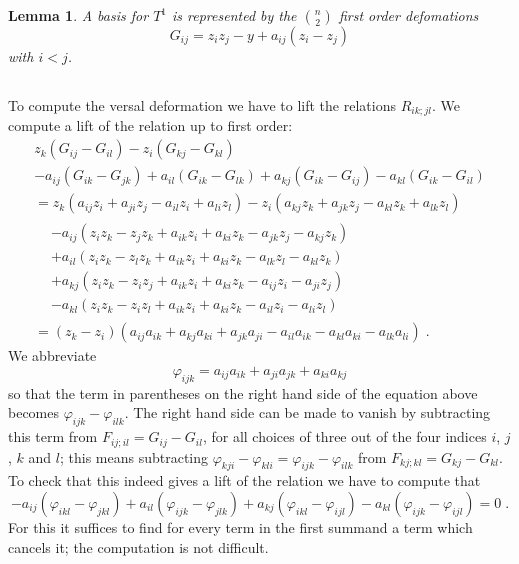 \documentclass[12pt,a4paper]{amsart}  %
\newcommand{\vp}{\varphi}
\newtheorem{lemma}[thm]{Lemma}
\theoremstyle{definition}
\theoremstyle{remark}
\newtheorem{remark}[thm]{Remark}
\begin{document}
\begin{lemma}
A basis for $T^1$ is represented by the $\binom n2$ first order defomations
\[G_{ij}=z_iz_j-y+ a_{ij}(z_i-z_j)\]
with $i<j$.
\end{lemma}




\subsection{}%
To compute the versal deformation we have to lift the relations $R_{ik;jl}$.
We %
compute a lift of the
relation up to first order:
\begin{multline*}
z_k(G_{ij}-G_{il})-z_i(G_{kj}-G_{kl})\\-a_{ij}(G_{ik}-G_{jk})+a_{il}(G_{ik}-G_{lk})
+a_{kj}(G_{ik}-G_{ij})-a_{kl}(G_{ik}-G_{il})
\\{}=
z_k(a_{ij}z_i+a_{ji}z_j -a_{il}z_i+a_{li}z_l)-z_i(a_{kj}z_k+a_{jk}z_j -a_{kl}z_k+a_{lk}z_l)\\
\begin{aligned}
&-a_{ij}(z_iz_k-z_jz_k+a_{ik}z_i+a_{ki}z_k-a_{jk}z_j-a_{kj}z_k)\\
&+a_{il}(z_iz_k-z_lz_k+a_{ik}z_i+a_{ki}z_k-a_{lk}z_l-a_{kl}z_k)\\
&+a_{kj}(z_iz_k-z_iz_j+a_{ik}z_i+a_{ki}z_k-a_{ij}z_i-a_{ji}z_j)\\
&-a_{kl}(z_iz_k-z_iz_l+a_{ik}z_i+a_{ki}z_k-a_{il}z_i-a_{li}z_l)
\end{aligned}\\{}
=(z_k-z_i)(a_{ij}a_{ik}+a_{kj}a_{ki}+a_{jk}a_{ji}-a_{il}a_{ik}-a_{kl}a_{ki}-a_{lk}a_{li})\;.
\end{multline*}
We abbreviate 
\[
\vp_{ijk} = a_{ij}a_{ik}+a_{ji}a_{jk}+a_{ki}a_{kj}
\]
so that the term in parentheses on the right hand side of the equation above
becomes $\vp_{ijk}-\vp_{ilk}$. The right hand side can be made to vanish
by subtracting this term from $F_{ij;il}=G_{ij}-G_{il}$, for all choices of three out of 
the four indices $i$, $j$, $k$ and $l$; this means
subtracting $\vp_{kji}-\vp_{kli}=\vp_{ijk}-\vp_{ilk}$ from $F_{kj;kl}=G_{kj}-G_{kl}$.
To check that this indeed gives a lift of the relation we have to compute that
\[
-a_{ij}(\vp_{ikl}-\vp_{jkl})+a_{il}(\vp_{ijk}-\vp_{jlk})
+a_{kj}(\vp_{ikl}-\vp_{ijl})-a_{kl}(\vp_{ijk}-\vp_{ijl})=0\;.
\]
For this it suffices to find for every term in the first summand a term which cancels it;
the computation is  not difficult.
\end{document}
